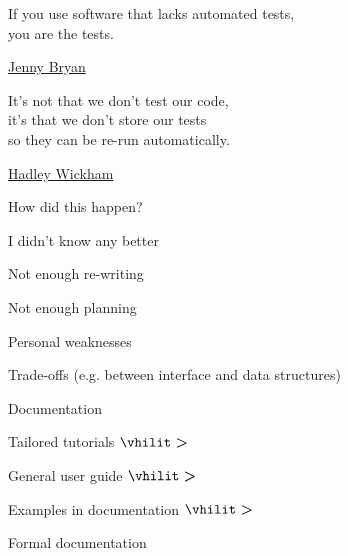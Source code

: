 \documentclass[12pt,t,aspectratio=169]{beamer}
\begin{document}
\begin{frame}[c]{}

\begin{center}
\large

If you use software that lacks automated tests, \\[2pt]
you are the tests.
\end{center}

\bigskip

\bigskip

\hfill
{\lolit
{\textendash} \href{https://twitter.com/JennyBryan}{Jenny Bryan} \hspace*{7mm}
}

\end{frame}


\begin{frame}[c]{}

\begin{center}
\large

It's not that we don't test our code, \\[2pt]
it's that we don't store our tests \\[2pt]
so they can be re-run automatically.
\end{center}

\bigskip

\bigskip

\hfill
{\lolit
{\textendash} \href{https://twitter.com/hadleywickham}{Hadley Wickham}
}

\end{frame}


\begin{frame}{How did this happen?}

  \bbi
\item I didn't know any better
\item Not enough re-writing
\item Not enough planning
\item Personal weaknesses
\item Trade-offs (e.g. between interface and data structures)
  \ei

\end{frame}




\begin{frame}{Documentation}

\bigskip \bigskip

  \large

  Tailored tutorials $\boldsymbol{\vhilit >}$

\bigskip

  \hspace{8mm} General user guide $\boldsymbol{\vhilit >}$

\bigskip

  \hspace{16mm} Examples in documentation $\boldsymbol{\vhilit >}$

\bigskip

  \hspace{24mm} Formal documentation

\end{frame}
\end{document}

